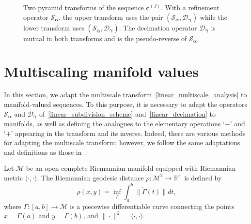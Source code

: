 \documentclass[12pt]{article}
\begin{document}
\begin{figure}[H]
\centering
 \caption{Two pyramid transforms of the sequence $\boldsymbol{c}^{(J)}$. With a refinement operator $\mathcal{S}_{\boldsymbol{\alpha}}$, the upper transform uses the pair $(\mathcal{S}_{\boldsymbol{\alpha}}, \mathcal{D}_{\boldsymbol{\gamma}})$ while the lower transform uses $(\mathcal{S}_{\widetilde{\boldsymbol{\alpha}}}, \mathcal{D}_{\boldsymbol{\gamma}})$. The decimation operator $\mathcal{D}_{\boldsymbol{\gamma}}$ is mutual in both transforms and is the pseudo-reverse of $\mathcal{S}_{\boldsymbol{\alpha}}$.}
 \label{fig:two_pyramids}
\end{figure}


\section{Multiscaling manifold values} \label{sec:multiscalingManifoldData}

In this section, we adapt the multiscale transform~\eqref{linear_multiscale_analysis} to manifold-valued sequences. To this purpose, it is necessary to adapt the operators $\mathcal{S}_{\boldsymbol{\alpha}}$ and $\mathcal{D}_{\boldsymbol{\gamma}}$ of~\eqref{linear_subdivision_scheme} and~\eqref{linear_decimation} to manifolds, as well as defining the analogues to the elementary operations `$-$' and `$+$' appearing in the transform and its inverse. Indeed, there are various methods for adapting the multiscale transform; however, we follow the same adaptations and definitions as those in~\cite {mattar2023pyramid}.

Let $\mathcal{M}$ be an open complete Riemannian manifold equipped with Riemannian metric $\langle\cdot,\cdot\rangle$. The Riemannian geodesic distance $\rho:\mathcal{M}^2\rightarrow\mathbb{R}^{+}$ is defined by
\begin{equation}~\label{Riemannian_geodesic}
    \rho(x,y)=\inf_{\Gamma}\int_{a}^b\|\dot{\Gamma}(t)\|dt,
\end{equation}
where $\Gamma:[a,b]\rightarrow\mathcal{M}$ is a piecewise differentiable curve connecting the points $x=\Gamma(a)$ and $y=\Gamma(b)$, and $\|\cdot\|^2=\langle\cdot,\cdot\rangle$.
\end{document}
